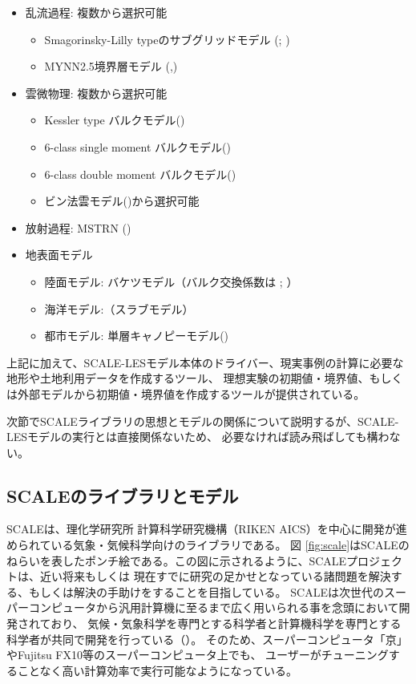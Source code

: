 \begin{itemize}
 \item 乱流過程: 複数から選択可能
   \begin{itemize}
    \item Smagorinsky-Lilly typeのサブグリッドモデル (\cite{smagorinsky_1963}; \cite{lilly_1962})
    \item MYNN2.5境界層モデル (\cite{my_1982},\cite{nakanishi_2004})
   \end{itemize}
 \item 雲微物理: 複数から選択可能
   \begin{itemize}
    \item Kessler type バルクモデル(\cite{kessler_1969})
    \item 6-class single moment バルクモデル(\cite{tomita_2008})
    \item 6-class double moment バルクモデル(\cite{sn_2014})
    \item ビン法雲モデル(\cite{suzuki_etal_2010})から選択可能
   \end{itemize}
 \item 放射過程: MSTRN (\cite{sekiguchi_2008})
 \item 地表面モデル
  \begin{itemize}
   \item 陸面モデル: バケツモデル（バルク交換係数は \cite{beljaars_1991}; \cite{wilson_2001}）
   \item 海洋モデル:（スラブモデル）
   \item 都市モデル: 単層キャノピーモデル(\cite{kusaka_2001})
  \end{itemize}
\end{itemize}

上記に加えて、SCALE-LESモデル本体のドライバー、現実事例の計算に必要な地形や土地利用データを作成するツール、
理想実験の初期値・境界値、もしくは外部モデルから初期値・境界値を作成するツールが提供されている。

次節でSCALEライブラリの思想とモデルの関係について説明するが、SCALE-LESモデルの実行とは直接関係ないため、
必要なければ読み飛ばしても構わない。


\subsection{SCALEのライブラリとモデル}
SCALEは、理化学研究所 計算科学研究機構（RIKEN AICS）を中心に開発が進められている気象・気候科学向けのライブラリである。
図 \ref{fig:scale}はSCALEのねらいを表したポンチ絵である。この図に示されるように、SCALEプロジェクトは、近い将来もしくは
現在すでに研究の足かせとなっている諸問題を解決する、もしくは解決の手助けをすることを目指している。
SCALEは次世代のスーパーコンピュータから汎用計算機に至るまで広く用いられる事を念頭において開発されており、
気候・気象科学を専門とする科学者と計算機科学を専門とする科学者が共同で開発を行っている（\cite{abe_etal_2013}）。
そのため、スーパーコンピュータ「京」やFujitsu FX10等のスーパーコンピュータ上でも、
ユーザーがチューニングすることなく高い計算効率で実行可能なようになっている。


